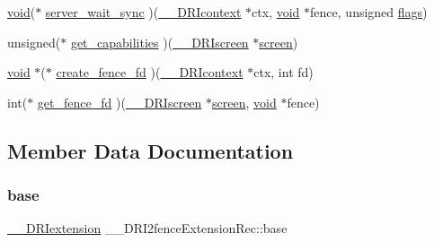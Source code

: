 \begin{DoxyCompactItemize}
\item 
\hyperlink{_s_d_l__opengles2__gl2ext_8h_ae5d8fa23ad07c48bb609509eae494c95}{void}($\ast$ \hyperlink{struct_____d_r_i2fence_extension_rec_af8c4b0fbe199095f333dc026284189b4}{server\+\_\+wait\+\_\+sync} )(\hyperlink{dri__interface_8h_a3fd295cba82b5a3d79f1ee7e12bfb908}{\+\_\+\+\_\+\+D\+R\+Icontext} $\ast$ctx, \hyperlink{_s_d_l__opengles2__gl2ext_8h_ae5d8fa23ad07c48bb609509eae494c95}{void} $\ast$fence, unsigned \hyperlink{glcorearb_8h_ac7ba7d3cce3d19ca020e056b37231289}{flags})
\item 
unsigned($\ast$ \hyperlink{struct_____d_r_i2fence_extension_rec_a21aaf599d663afa0f833c9e6221943fc}{get\+\_\+capabilities} )(\hyperlink{dri__interface_8h_a9961b01d421ee1fd6ed3c05acc9ca561}{\+\_\+\+\_\+\+D\+R\+Iscreen} $\ast$\hyperlink{cad_8h_ae04e09e4e3831bfc1632c509ae37dcec}{screen})
\item 
\hyperlink{_s_d_l__opengles2__gl2ext_8h_ae5d8fa23ad07c48bb609509eae494c95}{void} $\ast$($\ast$ \hyperlink{struct_____d_r_i2fence_extension_rec_af5d2a292e552237d4a4378807002013b}{create\+\_\+fence\+\_\+fd} )(\hyperlink{dri__interface_8h_a3fd295cba82b5a3d79f1ee7e12bfb908}{\+\_\+\+\_\+\+D\+R\+Icontext} $\ast$ctx, int fd)
\item 
int($\ast$ \hyperlink{struct_____d_r_i2fence_extension_rec_aeb23e98d96257fcc5e8b4aa67c49a14b}{get\+\_\+fence\+\_\+fd} )(\hyperlink{dri__interface_8h_a9961b01d421ee1fd6ed3c05acc9ca561}{\+\_\+\+\_\+\+D\+R\+Iscreen} $\ast$\hyperlink{cad_8h_ae04e09e4e3831bfc1632c509ae37dcec}{screen}, \hyperlink{_s_d_l__opengles2__gl2ext_8h_ae5d8fa23ad07c48bb609509eae494c95}{void} $\ast$fence)
\end{DoxyCompactItemize}


\subsection{Member Data Documentation}
\mbox{\label{struct_____d_r_i2fence_extension_rec_a887144d176907da6cc6f255baa6b142c}} 
\subsubsection{\texorpdfstring{base}{base}}
{\footnotesize\ttfamily \hyperlink{dri__interface_8h_a4e0a61c8ece00d2b2c6792a9a1b55385}{\+\_\+\+\_\+\+D\+R\+Iextension} \+\_\+\+\_\+\+D\+R\+I2fence\+Extension\+Rec\+::base}

